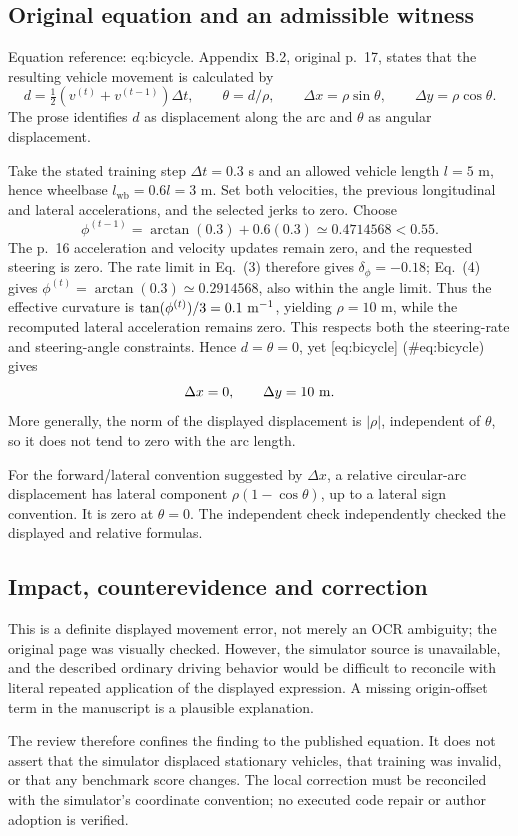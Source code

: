 \documentclass[10pt]{article}
\begin{document}
\subsection*{Original equation and an admissible witness}
Equation reference: eq:bicycle. Appendix B.2, original p. 17, states that the resulting vehicle movement is calculated by \[
 d=\tfrac12(v^{(t)}+v^{(t-1)})\Delta t,\qquad
 \theta=d/\rho,\qquad
 \Delta x=\rho\sin\theta,\qquad
 \Delta y=\rho\cos\theta.\] The prose identifies \(d\) as displacement along the arc and \(\theta\) as angular displacement.\par
Take the stated training step \(\Delta t=0.3\) s and an allowed vehicle length \(l=5\) m, hence wheelbase \(l_{\mathrm{wb}}=0.6l=3\) m. Set both velocities, the previous longitudinal and lateral accelerations, and the selected jerks to zero. Choose \[\phi^{(t-1)}=\arctan(0.3)+0.6(0.3)
\simeq0.4714568<0.55 .\] The p. 16 acceleration and velocity updates remain zero, and the requested steering is zero. The rate limit in Eq. (3) therefore gives \(\delta_\phi=-0.18\); Eq. (4) gives \(\phi^{(t)}=\arctan(0.3)\simeq0.2914568\), also within the angle limit. Thus the effective curvature is \(\tan(\phi^{(t)})/3=0.1\ {\rm m}^{-1}\), yielding \(\rho=10\) m, while the recomputed lateral acceleration remains zero. This respects both the steering-rate and steering-angle constraints. Hence \(d=\theta=0\), yet [eq:bicycle] (\#eq:bicycle) gives \[\Delta x=0,\qquad \Delta y=10\ {\rm m}.\] More generally, the norm of the displayed displacement is \(|\rho|\), independent of \(\theta\), so it does not tend to zero with the arc length.\par
For the forward/lateral convention suggested by \(\Delta x\), a relative circular-arc displacement has lateral component \(\rho(1-\cos\theta)\), up to a lateral sign convention. It is zero at \(\theta=0\). The independent check independently checked the displayed and relative formulas.\par
\subsection*{Impact, counterevidence and correction}
This is a definite displayed movement error, not merely an OCR ambiguity; the original page was visually checked. However, the simulator source is unavailable, and the described ordinary driving behavior would be difficult to reconcile with literal repeated application of the displayed expression. A missing origin-offset term in the manuscript is a plausible explanation.\par
The review therefore confines the finding to the published equation. It does not assert that the simulator displaced stationary vehicles, that training was invalid, or that any benchmark score changes. The local correction must be reconciled with the simulator’s coordinate convention; no executed code repair or author adoption is verified.\par
\end{document}
